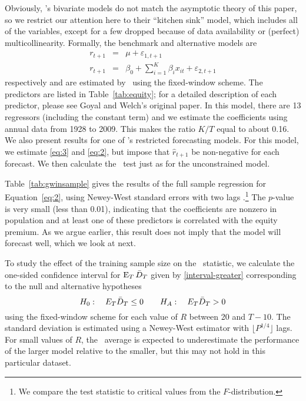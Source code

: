 \documentclass[11pt]{article}
\newcommand{\e}{\varepsilon}
\newcommand{\citepos}[1]{\citeauthor{#1}'s \citeyearpar{#1}}
\begin{document}
Obviously, \citepos{GoW:08} bivariate models do not
match the asymptotic theory of this paper, so we restrict our
attention here to their ``kitchen sink'' model, which includes all of
the variables, except for a few dropped because of data availability or
(perfect) multicollinearity.  Formally, the benchmark and alternative models are
\begin{eqnarray}
  \label{eq:3}
  r_{t+1} &=& \mu + \e_{1,t+1} \\
  \label{eq:2}
r_{t+1} &=& \beta_0 + \sum_{i=1}^K \beta_{i} x_{it} + \e_{2,t+1}  
\end{eqnarray}
respectively and are estimated by \ols\ using the fixed-window scheme.
The predictors are listed in Table~\ref{tab:equity}; for a detailed
description of each predictor, please see Goyal and Welch's original
paper.  In this model, there are 13 regressors (including the constant
term) and we estimate the coefficients using annual data from 1928 to
2009.  This makes the ratio $K/T$ equal to about 0.16.  We also
present results for one of \citepos{CaT:08}
restricted forecasting models.  For this model, we estimate
\eqref{eq:3} and \eqref{eq:2}, but impose that $\hat r_{t+1}$ be
non-negative for each forecast.  We then calculate the \oos\ test just
as for the unconstrained model.

Table~\ref{tab:gwinsample} gives the results of the full sample
regression for Equation~\eqref{eq:2}, using Newey-West standard errors
with two lags \citep{NeW:87}.\footnote{We compare the test statistic
  to critical values from the $F$-distribution.}  The $p$-value is
very small (less than 0.01), indicating that the coefficients are
nonzero in population and at least one of these predictors is
correlated with the equity premium.  As we argue earlier, this result
does not imply that the model will forecast well, which we look at
next.

To study the effect of the training sample size on the \dmw\ statistic, we
calculate the one-sided confidence interval for $\operatorname{E}_T \bar{D}_{T}$ given
by \eqref{interval-greater} corresponding to the null and alternative
hypotheses
\[ H_0: \quad E_T \bar{D}_{T} \leq 0 \qquad
H_A: \quad E_T \bar{D}_{T} > 0
\]
using the fixed-window scheme for each value of $R$ between 20 and
$T-10$.  The standard deviation is estimated using a Newey-West
estimator with $\lfloor P^{1/4}\rfloor$ lags.  For small values of
$R$, the \oos\ average is expected to underestimate the performance of
the larger model relative to the smaller, but this may not hold in
this particular dataset.
\end{document}
